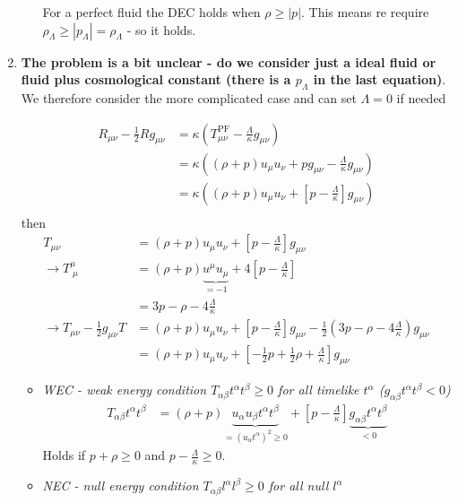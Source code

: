 \documentclass[10pt,a4paper]{article}
\theoremstyle{definition}
\begin{document}
\begin{enumerate}
\begin{itemize}
For a perfect fluid the DEC holds when $\rho\ge|p|$. This means re require $\rho_\Lambda\ge|p_\Lambda|=\rho_\Lambda$ - so it holds.

\end{itemize}

\item {\bf The problem is a bit unclear - do we consider just a ideal fluid or fluid plus cosmological constant (there is a $p_\Lambda$ in the last equation)}.
We therefore consider the more complicated case and can set $\Lambda=0$ if needed

\begin{align}
R_{\mu\nu}-\frac{1}{2}Rg_{\mu\nu}
&=\kappa\left(T^\text{PF}_{\mu\nu}-\frac{\Lambda}{\kappa} g_{\mu\nu}\right)\\
&=\kappa\left((\rho+p)u_\mu u_\nu+pg_{\mu\nu}-\frac{\Lambda}{\kappa} g_{\mu\nu}\right)\\
&=\kappa\left((\rho+p)u_\mu u_\nu+\left[p-\frac{\Lambda}{\kappa}\right]g_{\mu\nu}\right)\\
\end{align}
then
\begin{align}
T_{\mu\nu}&=(\rho+p)u_\mu u_\nu+\left[p-\frac{\Lambda}{\kappa}\right]g_{\mu\nu}\\
\rightarrow T^\mu_{\;\mu}
&=(\rho+p)\underbrace{u^\mu u_\mu}_{=-1}+4\left[p-\frac{\Lambda}{\kappa}\right]\\
&=3p-\rho-4\frac{\Lambda}{\kappa}\\
\rightarrow T_{\mu\nu}-\frac{1}{2}g_{\mu\nu}T
&=(\rho+p)u_\mu u_\nu+\left[p-\frac{\Lambda}{\kappa}\right]g_{\mu\nu}-\frac{1}{2}(3p-\rho-4\frac{\Lambda}{\kappa})g_{\mu\nu}\\
&=(\rho+p)u_\mu u_\nu+\left[-\frac{1}{2}p+\frac{1}{2}\rho+\frac{\Lambda}{\kappa}\right]g_{\mu\nu}
\end{align}
\begin{itemize}
\item {\it WEC - weak energy condition $T_{\alpha\beta}t^\alpha t^\beta\ge0$ for all timelike $t^\alpha$ ($g_{\alpha\beta}t^\alpha t^\beta<0$)}
\begin{align}
T_{\alpha\beta}t^\alpha t^\beta
&=(\rho+p)\underbrace{u_\alpha u_\beta t^\alpha t^\beta}_{=(u_\alpha t^\alpha)^2\ge0}+\left[p-\frac{\Lambda}{\kappa}\right]\underbrace{g_{\alpha\beta}t^\alpha t^\beta}_{<0}
\end{align}
Holds if $p+\rho\ge0$ and $p-\frac{\Lambda}{\kappa}\ge0$.
\item {\it NEC - null energy condition $T_{\alpha\beta}l^\alpha l^\beta\ge0$ for all null $l^\alpha$}


\end{itemize}
\end{enumerate}
\end{document}
